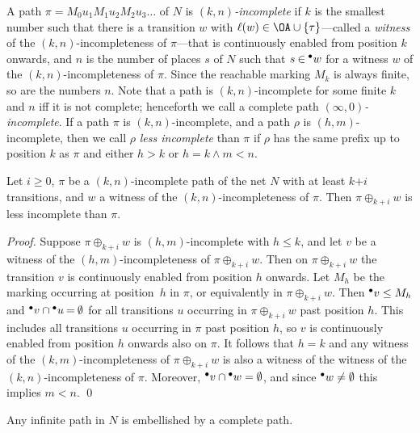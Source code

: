 \documentclass[smallcondensed]{svjour3}
\begin{document}
A path $\pi = M_0 u_1 M_1 u_2 M_2 u_3 \dots$ of $N$ is \emph{$(k,n)$-incomplete} if $k$ is the
smallest number such that there is a transition $w$ with $\ell(w)\in\OA\cup\{\tau\}$---called a \emph{witness} of the
$(k,n)$-incompleteness of $\pi$---that is continuously enabled from position $k$ onwards, and $n$ is
the number of places $s$ of $N$ such that
$s \mathbin\in\precond{w}$ for a witness $w$ of the $(k,n)$-incompleteness of $\pi$.
Since the reachable marking $M_k$ is always finite, so are the numbers $n$.
Note that a path is $(k,n)$-incomplete for some finite $k$ and $n$ iff it is not complete;
henceforth we call a complete path \emph{$(\infty,0)$-incomplete}.
If a path $\pi$ is $(k,n)$-incomplete, and a path $\rho$ is $(h,m)$-incomplete, then we call
$\rho$ \emph{less incomplete} than $\pi$ if $\rho$ has the same prefix up to position $k$
as $\pi$ and either $h>k$ or $h=k \wedge m<n$.

\begin{lemma}\label{lem:less incomplete}
Let $i\mathbin\geq 0$, $\pi$ be a $(k,n)$-incomplete path of the net $N$ with at least $k\mathord+i$
transitions, and $w$ a witness of the $(k,n)$-incompleteness of $\pi$. Then $\pi\oplus_{k+i}w$ is less incomplete than $\pi$.
\end{lemma}
\begin{proof}
Suppose $\pi\oplus_{k+i}w$ is $(h,m)$-incomplete with $h\leq k$, and let $v$ be a witness of the
$(h,m)$-incompleteness of $\pi\oplus_{k+i}w$.
Then on $\pi\oplus_{k+i}w$ the transition $v$ is continuously enabled from position $h$ onwards.
Let $M_h$ be the marking occurring at position~$h$ in $\pi$, or equivalently in $\pi\oplus_{k+i}w$.
Then $\precond{v}\leq M_h$ and \mbox{$\precond{v}\cap\precond{u}\mathbin=\emptyset$} for all transitions
$u$ occurring in $\pi\oplus_{k+i}w$ past position $h$. This includes all transitions $u$ occurring
in $\pi$ past position $h$, so $v$ is continuously enabled from position $h$ onwards also on $\pi$.
It follows that $h=k$ and any witness of the $(k,m)$-incompleteness of $\pi\oplus_{k+i}w$ is also a
witness of the witness of the $(k,n)$-incompleteness of $\pi$.
Moreover, $\precond{v}\cap\precond{w}=\emptyset$, and since
$\precond{w}\neq\emptyset$ this implies $m<n$.
\qed
\end{proof}

\begin{lemma}\label{lem:embellishment by complete path}
Any infinite path in $N$ is embellished by a complete path.
\end{lemma}
\end{document}
